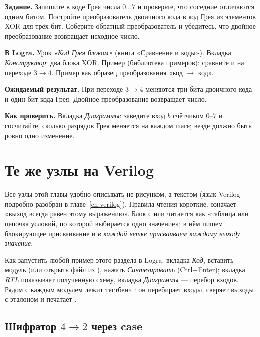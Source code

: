 \begin{diybox}
\textbf{Задание.}  Запишите в коде Грея числа $0\ldots7$ и
проверьте, что соседние отличаются одним битом.  Постройте
преобразователь двоичного кода в код Грея из элементов XOR для трёх бит.
 Соберите обратный преобразователь и убедитесь, что двойное
преобразование возвращает исходное число.

\textbf{В Logra.}  Урок \emph{«Код Грея блоком»} (книга «Сравнение
и коды»).  Вкладка \emph{Конструктор}: два блока XOR. Пример
 (библиотека примеров): сравните  и  на
переходе $3\to4$.  Пример  как образец
преобразования «код $\to$ код».

\textbf{Ожидаемый результат.} При переходе $3\to4$ меняются три
бита двоичного кода и один бит кода Грея. Двойное преобразование
возвращает число.

\textbf{Как проверить.} Вкладка \emph{Диаграммы}: заведите вход $b$
счётчиком $0$--$7$ и сосчитайте, сколько разрядов Грея меняется на
каждом шаге; везде должно быть ровно одно изменение.
\end{diybox}

\section{Те же узлы на Verilog}
\label{sec:coders-verilog}

Все узлы этой главы удобно описывать не рисунком, а текстом (язык Verilog
подробно разобран в главе~\ref{ch:verilog}). Правила чтения короткие.
 означает «выход всегда равен этому выражению».
Блок  с  или  читается как «таблица или
цепочка условий, по которой выбирается одно значение»; в нём пишем
блокирующее присваивание \code{=} и \emph{в каждой ветке присваиваем
каждому выходу значение}.

Как запустить любой пример этого раздела в Logra: вкладка \emph{Код},
вставить модуль (или открыть файл из ), нажать
\emph{Синтезировать} (Ctrl+Enter); вкладка \emph{RTL} показывает полученную
схему, вкладка \emph{Диаграммы} --- перебор входов. Рядом с каждым модулем лежит тестбенч
: он перебирает входы, сверяет выходы с эталоном и печатает
.

\subsection{Шифратор $4\to2$ через case}

